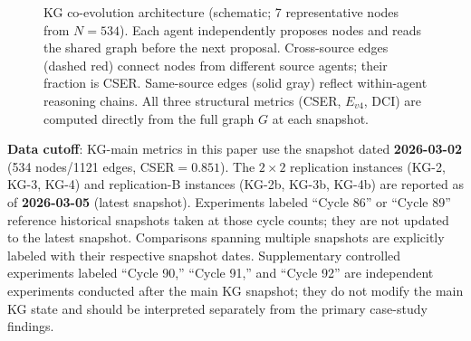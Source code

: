 \documentclass[12pt]{article}
\begin{document}
\begin{figure}[h!]
\caption{KG co-evolution architecture (schematic; 7 representative nodes
from $N=534$). Each agent independently proposes nodes and reads the shared
graph before the next proposal. Cross-source edges (dashed red) connect
nodes from different source agents; their fraction is CSER. Same-source
edges (solid gray) reflect within-agent reasoning chains. All three
structural metrics (CSER, $E_{v4}$, DCI) are computed directly from the
full graph $G$ at each snapshot.}
\label{fig:kg_structure}
\end{figure}

\medskip\noindent\textbf{Data cutoff}: KG-main metrics in this paper use the
snapshot dated \textbf{2026-03-02} (534 nodes/1121 edges, CSER$=0.851$).
The $2\times2$ replication instances (KG-2, KG-3, KG-4) and replication-B
instances (KG-2b, KG-3b, KG-4b) are reported as of \textbf{2026-03-05}
(latest snapshot). Experiments labeled ``Cycle 86'' or ``Cycle 89'' reference
historical snapshots taken at those cycle counts; they are not updated to the
latest snapshot. Comparisons spanning multiple snapshots are explicitly labeled
with their respective snapshot dates.
Supplementary controlled experiments labeled ``Cycle 90,'' ``Cycle 91,''
and ``Cycle 92'' are independent experiments conducted after the main KG
snapshot; they do not modify the main KG state and should be interpreted
separately from the primary case-study findings.
\end{document}
